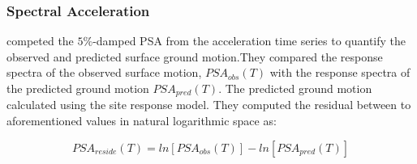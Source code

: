 \subsubsection{Spectral Acceleration}

\citet{Kaklamanos2013} competed the $5\%$-damped PSA from the acceleration time series to quantify the observed and predicted surface ground motion.They compared the response spectra of the observed surface motion, $PSA_{obs}(T)$ with the response spectra of the predicted ground motion $PSA_{pred}(T)$. The predicted ground motion calculated using the site response model. They computed the residual between to aforementioned values in natural logarithmic space as:

\begin{equation}
PSA_{reside}(T) = ln[PSA_{obs}(T)] - ln[PSA_{pred}(T)]
\end{equation} 